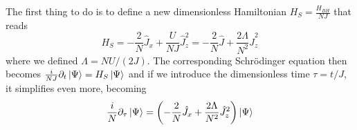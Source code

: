 The first thing to do is to define a new dimensionless Hamiltonian $ H_{S} = \frac{H_{BH}}{NJ} $ that reads
\begin{equation}
	\label{eq:DimensionlessBoseHubbardHamiltonian}
	H_{S} = -\frac{2}{N}\hat{J}_x +\frac{U}{NJ}\hat{J}_z ^{2} = -\frac{2}{N} \hat{J}+ \frac{2\Lambda}{N^2}\hat{J}_z^2
\end{equation}
where we defined $ \Lambda = NU/(2J) $.
The corresponding Schr{\"o}dinger equation then becomes $ \frac{i}{NJ}\partial_t\ket{\Psi} = H_{S}\ket{\Psi} $ and if we introduce the dimensionless time $ \tau = t/J $, it simplifies even more, becoming
\begin{equation}
	\label{eq:SchrodingerEquationDimensionless}
	\frac{i}{N}\partial_{\tau} \ket{\Psi} =
	\left(
	-\frac{2}{N} \hat{J}_{x}+ \frac{2\Lambda}{N^2}\hat{J}_z^2
	\right)\ket{\Psi}
\end{equation}

